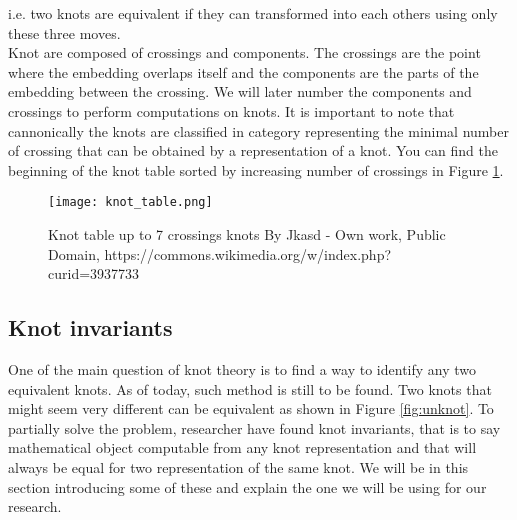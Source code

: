 \documentclass[12pt, a4paper]{article}
\begin{document}
i.e. two knots are equivalent if they can transformed into each others using only these three moves.\\

Knot are composed of crossings and components. The crossings are the point where the embedding overlaps itself and the components are the parts of the embedding between the crossing. We will later number the components and crossings to perform computations on knots. It is important to note that cannonically the knots are classified in category representing the minimal number of crossing that can be obtained by a representation of a knot. You can find the beginning of the knot table sorted by increasing number of crossings in Figure \ref{fig:knot_table}.

\begin{figure}[H]
  \centering
  \texttt{[image: knot\_table.png]}
  \caption{Knot table up to 7 crossings knots By Jkasd - Own work, Public Domain, https://commons.wikimedia.org/w/index.php?curid=3937733}
  \label{fig:knot_table}
\end{figure}

\subsection{Knot invariants}

One of the main question of knot theory is to find a way to identify any two equivalent knots. As of today, such method is still to be found. Two knots that might seem very different can be equivalent as shown in Figure \ref{fig:unknot}. To partially solve the problem, researcher have found knot invariants, that is to say mathematical object computable from any knot representation and that will always be equal for two representation of the same knot. We will be in this section introducing some of these and explain the one we will be using for our research.\\
\end{document}
